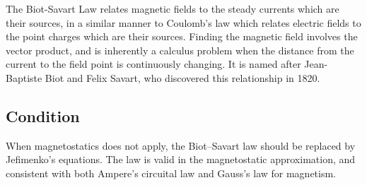 The Biot-Savart Law relates magnetic fields to the steady currents which are their sources, in a similar manner to Coulomb's law which relates electric fields to the point charges which are their sources. Finding the magnetic field involves the vector product, and is inherently a calculus problem when the distance from the current to the field point is continuously changing. It is named after Jean-Baptiste Biot and Felix Savart, who discovered this relationship in 1820. 

\subsection{Condition}
\quad When magnetostatics does not apply, the Biot–Savart law should be replaced by Jefimenko's equations. The law is valid in the magnetostatic approximation, and consistent with both Ampere's circuital law and Gauss's law for magnetism.



\pagebreak
%
